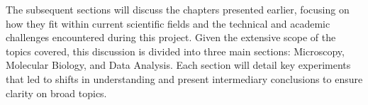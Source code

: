 \documentclass[12pt]{doctoral_thesis_uniwue}
\begin{document}

\newpage



%
\label{sec:summarising_discussion}%
The subsequent sections will discuss the chapters presented earlier, focusing on
how they fit within current scientific fields and the technical and academic
challenges encountered during this project. Given the extensive scope of the
topics covered, this discussion is divided into three main sections: Microscopy,
Molecular Biology, and Data Analysis. Each section will detail key experiments
that led to shifts in understanding and present intermediary conclusions to
ensure clarity on broad topics.







\newpage


\newpage




\renewcommand{\refname}{} %
\vspace{-2\vdouble} %


\pagestyle{headersfooters} %

\newpage


\appendix
\label{apdx}
\appendixpage
\addappheadtotoc

\captionsetup[figure]{labelformat=appendixfigure} %
\captionsetup[table]{labelformat=appendixtable} %
\end{document}
